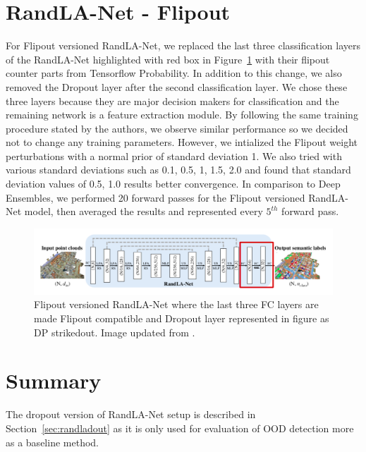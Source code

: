     \section{RandLA-Net - Flipout}
    For Flipout versioned RandLA-Net, we replaced the last three classification layers of the RandLA-Net highlighted with red box in Figure~\ref{fig:fout_randlanet} with their flipout counter parts from Tensorflow Probability.
    In addition to this change, we also removed the Dropout layer after the second classification layer.
    We chose these three layers because they are major decision makers for classification and the remaining network is a feature extraction module.
    By following the same training procedure stated by the authors, we observe similar performance so we decided not to change any training parameters.
    However, we intialized the Flipout weight perturbations with a normal prior of standard deviation 1.
    We also tried with various standard deviations such as 0.1, 0.5, 1, 1.5, 2.0 and found that standard deviation values of 0.5, 1.0 results better convergence.
    In comparison to Deep Ensembles, we performed 20 forward passes for the Flipout versioned RandLA-Net model, then averaged the results and represented every $5^{th}$ forward pass.
    \begin{figure}
        \centering
        \includegraphics[scale=0.42]{images/fout_randlanet.png}
        \caption{Flipout versioned RandLA-Net where the last three FC layers are made Flipout compatible and Dropout layer represented in figure as DP strikedout. Image updated from \cite{Hu_2020_CVPR_Randla}.}
        \label{fig:fout_randlanet}
    \end{figure}

    \section{Summary}
    The dropout version of RandLA-Net setup is described in Section~\ref{sec:randladout} as it is only used for evaluation of OOD detection more as a baseline method.


